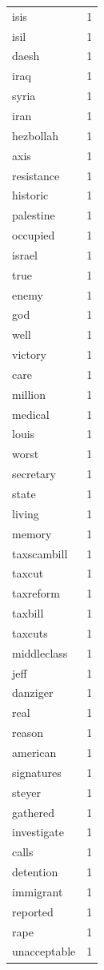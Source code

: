 \begin{tabular}{lr}
isis & 1 \\
isil & 1 \\
daesh & 1 \\
iraq & 1 \\
syria & 1 \\
iran & 1 \\
hezbollah & 1 \\
axis & 1 \\
resistance & 1 \\
historic & 1 \\
palestine & 1 \\
occupied & 1 \\
israel & 1 \\
true & 1 \\
enemy & 1 \\
god & 1 \\
well & 1 \\
victory & 1 \\
care & 1 \\
million & 1 \\
medical & 1 \\
louis & 1 \\
worst & 1 \\
secretary & 1 \\
state & 1 \\
living & 1 \\
memory & 1 \\
taxscambill & 1 \\
taxcut & 1 \\
taxreform & 1 \\
taxbill & 1 \\
taxcuts & 1 \\
middleclass & 1 \\
jeff & 1 \\
danziger & 1 \\
real & 1 \\
reason & 1 \\
american & 1 \\
signatures & 1 \\
steyer & 1 \\
gathered & 1 \\
investigate & 1 \\
calls & 1 \\
detention & 1 \\
immigrant & 1 \\
reported & 1 \\
rape & 1 \\
unacceptable & 1 \\

\end{tabular}
